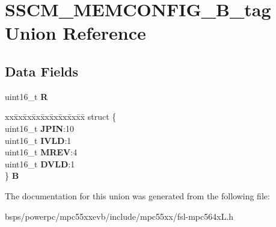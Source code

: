 \hypertarget{unionSSCM__MEMCONFIG__16B__tag}{}\section{S\+S\+C\+M\+\_\+\+M\+E\+M\+C\+O\+N\+F\+I\+G\+\_\+B\+\_\+tag Union Reference}
\label{unionSSCM__MEMCONFIG__16B__tag}
\subsection*{Data Fields}
\begin{DoxyCompactItemize}
\item 
\mbox{\label{unionSSCM__MEMCONFIG__16B__tag_ac93d9f4c400f3b405f3314dd8f296fd7}} 
uint16\+\_\+t {\bfseries R}
\item 
\mbox{\label{unionSSCM__MEMCONFIG__16B__tag_ace4db10564dd1e5c96f514c803e6f3e4}} 
\begin{tabbing}
xx\=xx\=xx\=xx\=xx\=xx\=xx\=xx\=xx\=\kill
struct \{\\
\>uint16\_t {\bfseries JPIN}:10\\
\>uint16\_t {\bfseries IVLD}:1\\
\>uint16\_t {\bfseries MREV}:4\\
\>uint16\_t {\bfseries DVLD}:1\\
\} {\bfseries B}\\

\end{tabbing}\end{DoxyCompactItemize}


The documentation for this union was generated from the following file\+:\begin{DoxyCompactItemize}
\item 
bsps/powerpc/mpc55xxevb/include/mpc55xx/fsl-\/mpc564x\+L.\+h\end{DoxyCompactItemize}
